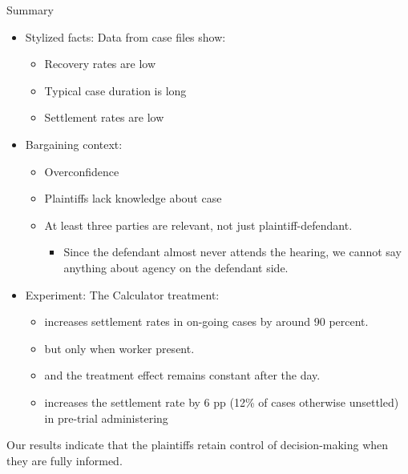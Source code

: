 \documentclass[9pt]{beamer}
\begin{document}
\begin{frame}{Summary}
  \begin{itemize}
  \item \alert{Stylized facts:} Data from case files show:
  \begin{itemize}
      \item Recovery rates are low
      \item Typical case duration is long
      \item Settlement rates are low
  \end{itemize}  
    \vspace{0.05in}
    \pause
  \item  \alert{Bargaining context:} 
  \begin{itemize}
      \item Overconfidence
      \item Plaintiffs lack knowledge about case
      \item At least three parties are relevant, not just plaintiff-defendant. 
      \begin{itemize}
          \item Since the defendant almost never attends the hearing, we cannot say anything about agency on the defendant side. 
      \end{itemize}
  \end{itemize}
    \vspace{2mm}
    \pause
  \item \alert{Experiment:} The Calculator treatment:
\begin{itemize} 
    \item increases settlement rates in on-going cases by around 90 percent.
    \item but \alert{only when worker present}.
    \item and the treatment effect remains constant after the day.
    \item increases the settlement rate by 6 pp (12\% of cases otherwise unsettled) in pre-trial administering
\end{itemize}

  \end{itemize}
  \vspace{2mm}
  \pause
Our results indicate that the plaintiffs retain control of decision-making when they are fully informed. 
 \end{frame}
 
\end{document}
